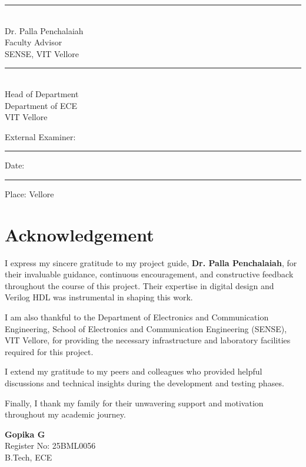 \documentclass[12pt,a4paper]{report}
\begin{document}
\vspace{2cm}
\noindent
\begin{minipage}{0.45\textwidth}
    \rule{5cm}{0.4pt}\\Dr. Palla Penchalaiah\\Faculty Advisor\\SENSE, VIT Vellore
\end{minipage}
\hfill
\begin{minipage}{0.45\textwidth}
    \rule{5cm}{0.4pt}\\Head of Department\\Department of ECE\\VIT Vellore
\end{minipage}

\vspace{1cm}
\noindent External Examiner: \rule{5cm}{0.4pt}
\vspace{1cm}
\noindent Date: \rule{3cm}{0.4pt} \hfill Place: Vellore

\clearpage
\chapter*{Acknowledgement}

I express my sincere gratitude to my project guide, \textbf{Dr. Palla Penchalaiah}, for their invaluable guidance, continuous encouragement, and constructive feedback throughout the course of this project. Their expertise in digital design and Verilog HDL was instrumental in shaping this work.

I am also thankful to the Department of Electronics and Communication Engineering, School of Electronics and Communication Engineering (SENSE), VIT Vellore, for providing the necessary infrastructure and laboratory facilities required for this project.

I extend my gratitude to my peers and colleagues who provided helpful discussions and technical insights during the development and testing phases.

Finally, I thank my family for their unwavering support and motivation throughout my academic journey.

\vspace{1cm}
\noindent\textbf{Gopika G}\\Register No: 25BML0056\\B.Tech, ECE

\clearpage
\end{document}
